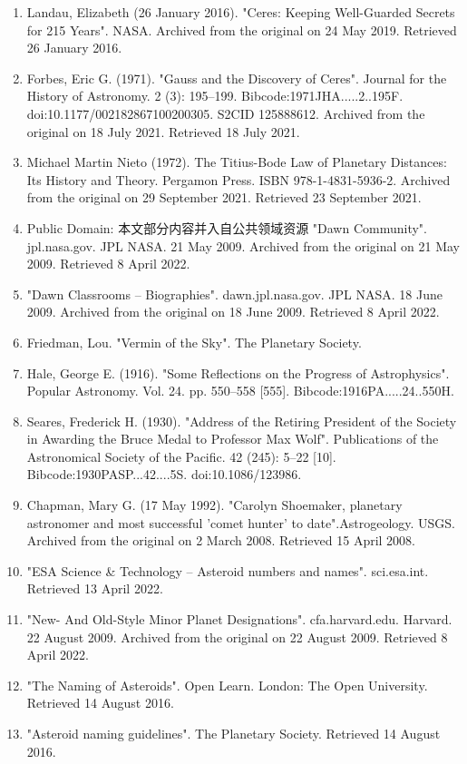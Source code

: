 \begin{enumerate}
\item Landau, Elizabeth (26 January 2016). "Ceres: Keeping Well-Guarded Secrets for 215 Years". NASA. Archived from the original on 24 May 2019. Retrieved 26 January 2016.
\item Forbes, Eric G. (1971). "Gauss and the Discovery of Ceres". Journal for the History of Astronomy. 2 (3): 195–199. Bibcode:1971JHA.....2..195F. doi:10.1177/002182867100200305. S2CID 125888612. Archived from the original on 18 July 2021. Retrieved 18 July 2021.
\item Michael Martin Nieto (1972). The Titius-Bode Law of Planetary Distances: Its History and Theory. Pergamon Press. ISBN 978-1-4831-5936-2. Archived from the original on 29 September 2021. Retrieved 23 September 2021.
\item Public Domain: 本文部分内容并入自公共领域资源 "Dawn Community". jpl.nasa.gov. JPL NASA. 21 May 2009. Archived from the original on 21 May 2009. Retrieved 8 April 2022.
\item "Dawn Classrooms – Biographies". dawn.jpl.nasa.gov. JPL NASA. 18 June 2009. Archived from the original on 18 June 2009. Retrieved 8 April 2022.
\item Friedman, Lou. "Vermin of the Sky". The Planetary Society.
\item Hale, George E. (1916). "Some Reflections on the Progress of Astrophysics". Popular Astronomy. Vol. 24. pp. 550–558 [555]. Bibcode:1916PA.....24..550H.
\item Seares, Frederick H. (1930). "Address of the Retiring President of the Society in Awarding the Bruce Medal to Professor Max Wolf". Publications of the Astronomical Society of the Pacific. 42 (245): 5–22 [10]. Bibcode:1930PASP...42....5S. doi:10.1086/123986.
\item Chapman, Mary G. (17 May 1992). "Carolyn Shoemaker, planetary astronomer and most successful 'comet hunter' to date".Astrogeology. USGS. Archived from the original on 2 March 2008. Retrieved 15 April 2008.
\item "ESA Science & Technology – Asteroid numbers and names". sci.esa.int. Retrieved 13 April 2022.
\item "New- And Old-Style Minor Planet Designations". cfa.harvard.edu. Harvard. 22 August 2009. Archived from the original on 22 August 2009. Retrieved 8 April 2022.
\item "The Naming of Asteroids". Open Learn. London: The Open University. Retrieved 14 August 2016.
\item "Asteroid naming guidelines". The Planetary Society. Retrieved 14 August 2016.

\end{enumerate}
